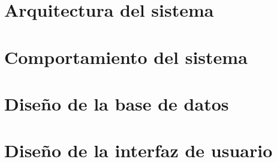 \section{Arquitectura del sistema}
\label{arquitectura_sistema}


\section{Comportamiento del sistema}
\label{comportamiento_sistema}

\section{Diseño de la base de datos}
\label{diseno_base_datos}

\section{Diseño de la interfaz de usuario}
\label{diseno_interfaz_usuario}